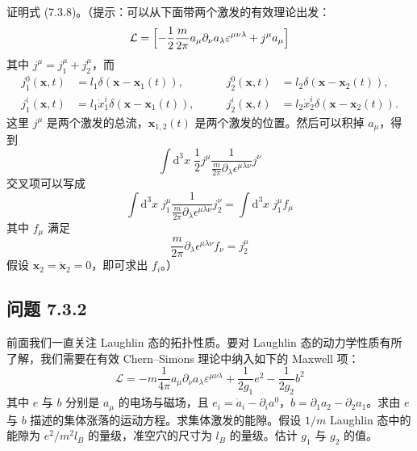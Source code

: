 证明式 (7.3.8)。（提示：可以从下面带两个激发的有效理论出发：
\begin{equation*}
\mathcal{L}=\Bigl[-\frac{1}{2}\frac{m}{2\pi}a_\mu\partial_\nu a_\lambda\varepsilon^{\mu\nu\lambda}+j^\mu a_\mu\Bigr]
\end{equation*}
其中 $j^\mu=j_1^\mu+j_2^\mu$，而
\begin{equation*}
\begin{aligned}
j_1^0(\pmb{x},t)&=l_1\delta(\pmb{x}-\pmb{x}_1(t)),&\qquad j_2^0(\pmb{x},t)&=l_2\delta(\pmb{x}-\pmb{x}_2(t)),\\
j_1^i(\pmb{x},t)&=l_1\dot{x}_1^i\delta(\pmb{x}-\pmb{x}_1(t)),&\qquad j_2^i(\pmb{x},t)&=l_2\dot{x}_2^i\delta(\pmb{x}-\pmb{x}_2(t)).
\end{aligned}
\end{equation*}
这里 $j^\mu$ 是两个激发的总流，$\pmb{x}_{1,2}(t)$ 是两个激发的位置。然后可以积掉 $a_\mu$，得到
\begin{equation*}
\int\mathrm{d}^3x\;\frac{1}{2}j^\mu\frac{1}{\frac{m}{2\pi}\partial_\lambda\epsilon^{\mu\lambda\nu}}j^\nu
\end{equation*}
交叉项可以写成
\begin{equation*}
\int\mathrm{d}^3x\;j_1^\mu\frac{1}{\frac{m}{2\pi}\partial_\lambda\epsilon^{\mu\lambda\nu}}j_2^\nu=\int\mathrm{d}^3x\;j_1^\mu f_\mu
\end{equation*}
其中 $f_\mu$ 满足
\begin{equation*}
\frac{m}{2\pi}\partial_\lambda\epsilon^{\mu\lambda\nu}f_\nu=j_2^\mu
\end{equation*}
假设 $\pmb{x}_2=\dot{\pmb{x}}_2=0$，即可求出 $f_i$。）

\subsection*{问题 7.3.2}

前面我们一直关注 Laughlin 态的拓扑性质。要对 Laughlin 态的动力学性质有所了解，我们需要在有效 Chern--Simons 理论中纳入如下的 Maxwell 项：
\begin{equation*}
\mathcal{L}=-m\frac{1}{4\pi}a_\mu\partial_\nu a_\lambda\varepsilon^{\mu\nu\lambda}+\frac{1}{2g_1}e^2-\frac{1}{2g_2}b^2
\tag{7.3.11}
\end{equation*}
其中 $e$ 与 $b$ 分别是 $a_\mu$ 的电场与磁场，且 $e_i=\dot{a}_i-\partial_i a^0$，$b=\partial_1a_2-\partial_2a_1$。求由 $e$ 与 $b$ 描述的集体涨落的运动方程。求集体激发的能隙。假设 $1/m$ Laughlin 态中的能隙为 $e^2/m^2 l_B$ 的量级，准空穴的尺寸为 $l_B$ 的量级。估计 $g_1$ 与 $g_2$ 的值。

